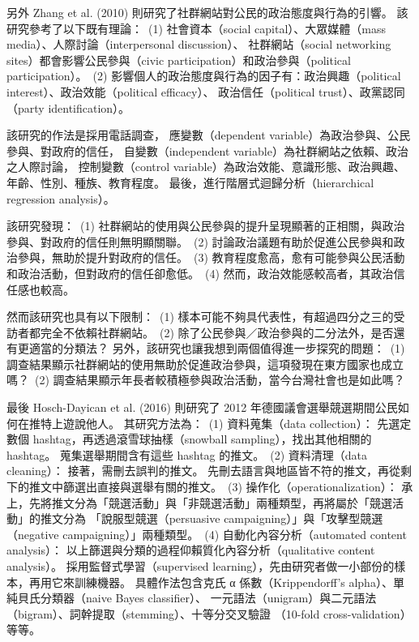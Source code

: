 \documentclass[a4paper, 10pt, conference]{ieeeconf}       %
\begin{document}
\begin{CJK}{UTF8}{bsmi}
另外 Zhang et al. (2010) 則研究了社群網站對公民的政治態度與行為的引響。\cite{c2} %
該研究參考了以下既有理論：%
\,(1) 社會資本（social capital）、大眾媒體（mass media）、人際討論（interpersonal discussion）、%
社群網站（social networking sites）都會影響公民參與（civic participation）和政治參與（political participation）。%
\,(2) 影響個人的政治態度與行為的因子有：政治興趣（political interest）、政治效能（political efficacy）、%
政治信任（political trust）、政黨認同（party identification）。%

該研究的作法是採用電話調查，%
應變數（dependent variable）為政治參與、公民參與、對政府的信任，%
自變數（independent variable）為社群網站之依賴、政治之人際討論，%
控制變數（control variable）為政治效能、意識形態、政治興趣、年齡、性別、種族、教育程度。%
最後，進行階層式迴歸分析（hierarchical regression analysis）。%

該研究發現：%
\,(1) 社群網站的使用與公民參與的提升呈現顯著的正相關，與政治參與、對政府的信任則無明顯關聯。%
\,(2) 討論政治議題有助於促進公民參與和政治參與，無助於提升對政府的信任。%
\,(3) 教育程度愈高，愈有可能參與公民活動和政治活動，但對政府的信任卻愈低。%
\,(4) 然而，政治效能感較高者，其政治信任感也較高。%

然而該研究也具有以下限制：%
\,(1) 樣本可能不夠具代表性，有超過四分之三的受訪者都完全不依賴社群網站。%
\,(2) 除了公民參與／政治參與的二分法外，是否還有更適當的分類法？%
另外，該研究也讓我想到兩個值得進一步探究的問題：%
\,(1) 調查結果顯示社群網站的使用無助於促進政治參與，這項發現在東方國家也成立嗎？%
\,(2) 調查結果顯示年長者較積極參與政治活動，當今台灣社會也是如此嗎？%

最後 Hosch-Dayican et al. (2016) 則研究了 2012 年德國議會選舉競選期間公民如何在推特上遊說他人。\cite{c3} %
其研究方法為：%
\,(1) 資料蒐集（data collection）：%
先選定數個 hashtag，再透過滾雪球抽樣（snowball sampling），找出其他相關的 hashtag。%
蒐集選舉期間含有這些 hashtag 的推文。%
\,(2) 資料清理（data cleaning）：%
接著，需刪去誤判的推文。%
先刪去語言與地區皆不符的推文，再從剩下的推文中篩選出直接與選舉有關的推文。%
\,(3) 操作化（operationalization）：%
承上，先將推文分為「競選活動」與「非競選活動」兩種類型，再將屬於「競選活動」的推文分為%
「說服型競選（persuasive campaigning）」與「攻擊型競選（negative campaigning）」兩種類型。%
\,(4) 自動化內容分析（automated content analysis）：%
以上篩選與分類的過程仰賴質化內容分析（qualitative content analysis）。%
採用監督式學習（supervised learning），先由研究者做一小部份的樣本，再用它來訓練機器。%
具體作法包含克氏 α 係數（Krippendorff's alpha）、單純貝氏分類器（naive Bayes classifier）、%
一元語法（unigram）與二元語法（bigram）、詞幹提取（stemming）、十等分交叉驗證%
（10-fold cross-validation）等等。%


\end{CJK}
\end{document}
